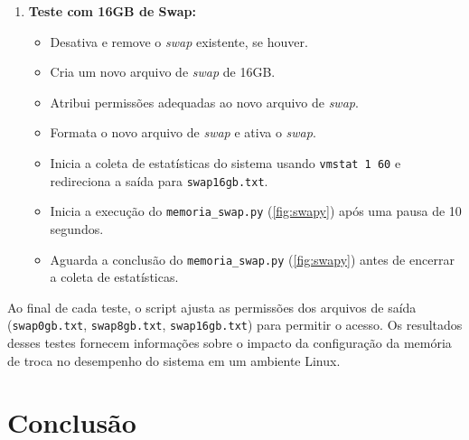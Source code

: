 \documentclass[
	12pt,				%
	openright,			%
	oneside,			%
	a4paper,			%
	chapter=TITLE,		%
	english,			%
	french,				%
	spanish,			%
	brazil				%
	]{abntex2}
\theoremstyle{definition}
\begin{document}
\begin{enumerate}[label=\arabic*.]
    \item \textbf{Teste com 16GB de Swap:}
    \begin{itemize}
        \item Desativa e remove o \textit{swap} existente, se houver.
        \item Cria um novo arquivo de \textit{swap} de 16GB.
        \item Atribui permissões adequadas ao novo arquivo de \textit{swap}.
        \item Formata o novo arquivo de \textit{swap} e ativa o \textit{swap}.
        \item Inicia a coleta de estatísticas do sistema usando \texttt{vmstat 1 60} e redireciona a saída para \texttt{swap16gb.txt}.
        \item Inicia a execução do \texttt{memoria\_swap.py} (\ref{fig:swapy}) após uma pausa de 10 segundos.
        \item Aguarda a conclusão do \texttt{memoria\_swap.py} (\ref{fig:swapy}) antes de encerrar a coleta de estatísticas.
    \end{itemize}
\end{enumerate}

Ao final de cada teste, o script ajusta as permissões dos arquivos de saída (\texttt{swap0gb.txt}, 
\texttt{swap8gb.txt}, \texttt{swap16gb.txt}) para permitir o acesso. Os resultados desses testes 
fornecem informações sobre o impacto da configuração da memória de troca no desempenho do sistema 
em um ambiente Linux.




\chapter{Conclusão}
\label{conclusao}


\postextual







\end{document}
